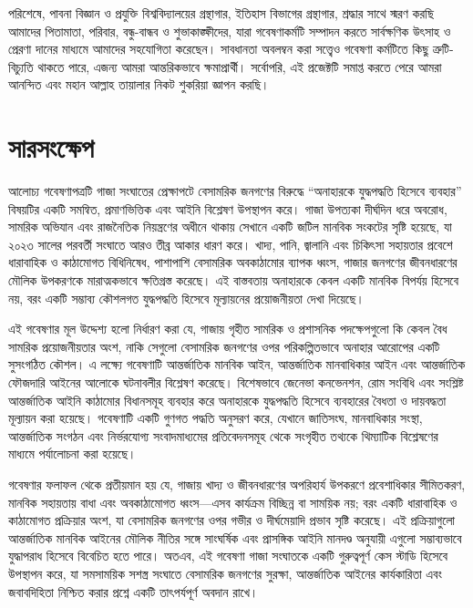 পরিশেষে, পাবনা বিজ্ঞান ও প্রযুক্তি বিশ্ববিদ্যালয়ের গ্রন্থাগার, ইতিহাস বিভাগের গ্রন্থাগার, শ্রদ্ধার সাথে স্মরণ করছি আমাদের পিতামাতা, পরিবার, বন্ধু-বান্ধব ও শুভাকাঙ্ক্ষীদের, যারা গবেষণাকর্মটি সম্পাদন করতে সার্বক্ষণিক উৎসাহ ও প্রেরণা দানের মাধ্যমে আমাদের সহযোগিতা করেছেন। সাবধানতা অবলম্বন করা সত্ত্বেও গবেষণা কর্মটিতে কিছু ত্রুটি-বিচ্যুতি থাকতে পারে, এজন্য আমরা আন্তরিকভাবে ক্ষমাপ্রার্থী। সর্বোপরি, এই প্রজেক্টটি সমাপ্ত করতে পেরে আমরা আনন্দিত এবং মহান আল্লাহ তায়ালার নিকট শুকরিয়া জ্ঞাপন করছি।

\clearpage
\section*{সারসংক্ষেপ}

\vspace{1em}
আলোচ্য গবেষণাপত্রটি গাজা সংঘাতের প্রেক্ষাপটে বেসামরিক জনগণের বিরুদ্ধে ``অনাহারকে যুদ্ধপদ্ধতি হিসেবে ব্যবহার'' বিষয়টির একটি সমন্বিত, প্রমাণভিত্তিক এবং আইনি বিশ্লেষণ উপস্থাপন করে। গাজা উপত্যকা দীর্ঘদিন ধরে অবরোধ, সামরিক অভিযান এবং রাজনৈতিক নিয়ন্ত্রণের অধীনে থাকায় সেখানে একটি জটিল মানবিক সংকটের সৃষ্টি হয়েছে, যা ২০২৩ সালের পরবর্তী সংঘাতে আরও তীব্র আকার ধারণ করে। খাদ্য, পানি, জ্বালানি এবং চিকিৎসা সহায়তার প্রবেশে ধারাবাহিক ও কাঠামোগত বিধিনিষেধ, পাশাপাশি বেসামরিক অবকাঠামোর ব্যাপক ধ্বংস, গাজার জনগণের জীবনধারণের মৌলিক উপকরণকে মারাত্মকভাবে ক্ষতিগ্রস্ত করেছে। এই বাস্তবতায় অনাহারকে কেবল একটি মানবিক বিপর্যয় হিসেবে নয়, বরং একটি সম্ভাব্য কৌশলগত যুদ্ধপদ্ধতি হিসেবে মূল্যায়নের প্রয়োজনীয়তা দেখা দিয়েছে।

এই গবেষণার মূল উদ্দেশ্য হলো নির্ধারণ করা যে, গাজায় গৃহীত সামরিক ও প্রশাসনিক পদক্ষেপগুলো কি কেবল বৈধ সামরিক প্রয়োজনীয়তার অংশ, নাকি সেগুলো বেসামরিক জনগণের ওপর পরিকল্পিতভাবে অনাহার আরোপের একটি সুসংগঠিত কৌশল। এ লক্ষ্যে গবেষণাটি আন্তর্জাতিক মানবিক আইন, আন্তর্জাতিক মানবাধিকার আইন এবং আন্তর্জাতিক ফৌজদারি আইনের আলোকে ঘটনাবলীর বিশ্লেষণ করেছে। বিশেষভাবে জেনেভা কনভেনশন, রোম সংবিধি এবং সংশ্লিষ্ট আন্তর্জাতিক আইনি কাঠামোর বিধানসমূহ ব্যবহার করে অনাহারকে যুদ্ধপদ্ধতি হিসেবে ব্যবহারের বৈধতা ও দায়বদ্ধতা মূল্যায়ন করা হয়েছে। গবেষণাটি একটি গুণগত পদ্ধতি অনুসরণ করে, যেখানে জাতিসংঘ, মানবাধিকার সংস্থা, আন্তর্জাতিক সংগঠন এবং নির্ভরযোগ্য সংবাদমাধ্যমের প্রতিবেদনসমূহ থেকে সংগৃহীত তথ্যকে থিম্যাটিক বিশ্লেষণের মাধ্যমে পর্যালোচনা করা হয়েছে।

গবেষণার ফলাফল থেকে প্রতীয়মান হয় যে, গাজায় খাদ্য ও জীবনধারণের অপরিহার্য উপকরণে প্রবেশাধিকার সীমিতকরণ, মানবিক সহায়তায় বাধা এবং অবকাঠামোগত ধ্বংস---এসব কার্যক্রম বিচ্ছিন্ন বা সাময়িক নয়; বরং একটি ধারাবাহিক ও কাঠামোগত প্রক্রিয়ার অংশ, যা বেসামরিক জনগণের ওপর গভীর ও দীর্ঘমেয়াদি প্রভাব সৃষ্টি করেছে। এই প্রক্রিয়াগুলো আন্তর্জাতিক মানবিক আইনের মৌলিক নীতির সঙ্গে সাংঘর্ষিক এবং প্রাসঙ্গিক আইনি মানদণ্ড অনুযায়ী এগুলো সম্ভাব্যভাবে যুদ্ধাপরাধ হিসেবে বিবেচিত হতে পারে। অতএব, এই গবেষণা গাজা সংঘাতকে একটি গুরুত্বপূর্ণ কেস স্টাডি হিসেবে উপস্থাপন করে, যা সমসাময়িক সশস্ত্র সংঘাতে বেসামরিক জনগণের সুরক্ষা, আন্তর্জাতিক আইনের কার্যকারিতা এবং জবাবদিহিতা নিশ্চিত করার প্রশ্নে একটি তাৎপর্যপূর্ণ অবদান রাখে।

